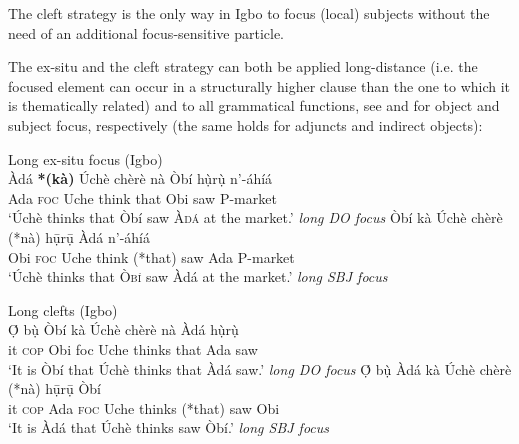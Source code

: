 \documentclass[output=paper,colorlinks,citecolor=brown]{langscibook}
\begin{document}
The cleft strategy is the only way in Igbo to focus (local) subjects without the need of an additional focus-sensitive particle.

The ex-situ and the cleft strategy can both be applied long-distance (i.e. the focused element can occur in a structurally higher clause than the one to which it is thematically related) and to all grammatical functions, see  and  for object and subject focus, respectively (the same holds for adjuncts and indirect objects):

\ea%
    \label{ex:amaechi:7}
    Long ex-situ focus (Igbo)\\
    \ea\label{ex:amaechi:7a}
    \gll    Àdá \textbf{*(kà)} Úchè chèrè nà Òbí hụ̀rụ̀ {\longrule} n'-áhíá\\
            Ada \textsc{foc} Uche think that Obi saw {} P-market\\
    \glt    `Úchè thinks that Òbí saw \textsc{Àdá} at the market.' \hfill\textit{\small long DO focus}
    \ex\label{ex:amaechi:7b}
    \gll    Òbí kà Úchè chèrè (*nà) {\longrule} hụ̄rụ̄ Àdá n'-áhíá\\
            Obi \textsc{foc} Uche think (*that) {} saw Ada  P-market\\
    \glt    `Úchè thinks that \textsc{Òbí} saw Àdá at the market.' \hfill\textit{\small long SBJ focus}
    \z
\z

\ea%
    \label{ex:amaechi:8}
    Long clefts (Igbo)\\
    \ea\label{ex:amaechi:8a}
    \gll    Ọ́ bụ̀ Òbí kà Úchè chèrè nà Àdá hụ̀rụ̀ {\longrule}\\
	        it \textsc{cop} Obi foc Uche thinks that Ada saw {}\\
    \glt    `It is Òbí that Úchè thinks that Àdá saw.' \hfill\textit{long DO focus}
    \ex\label{ex:amaechi:8b}
    \gll    Ọ́ bụ̀ Àdá kà Úchè chèrè (*nà) {\longrule} hụ̄rụ̄ Òbí\\
	        it \textsc{cop} Ada \textsc{foc} Uche thinks (*that) {} saw Obi\\
    \glt    `It is Àdá that Úchè thinks saw Òbí.' \hfill\textit{long SBJ focus}
    \z
\z
\end{document}
